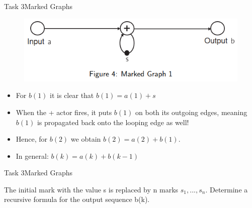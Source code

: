\begin{frame}{Task 3}{Marked Graphs}
    \begin{solution}
    \begin{figure}
        \centering
        \includegraphics[scale=0.6]{figures/markedGraph.PNG}
    \end{figure}
    \begin{itemize}
        \item For $b(1)$ it is clear that $b(1) = a(1) + s$
        \item When the + actor fires, it puts $b(1)$ on both its outgoing edges, meaning $b(1)$ is propagated back onto the looping edge as well!
        \item Hence, for $b(2)$ we obtain $b(2) = a(2) + b(1)$.
        \item In general: $b(k) = a(k) + b(k-1)$
    \end{itemize}
    \end{solution}
\end{frame}
\begin{frame}{Task 3}{Marked Graphs}
    \begin{tasknoinc}
        The initial mark with the value s is replaced by n marks $s_1, ..., s_n$. Determine a recursive formula for the output sequence b(k).
    \end{tasknoinc}
\end{frame}
